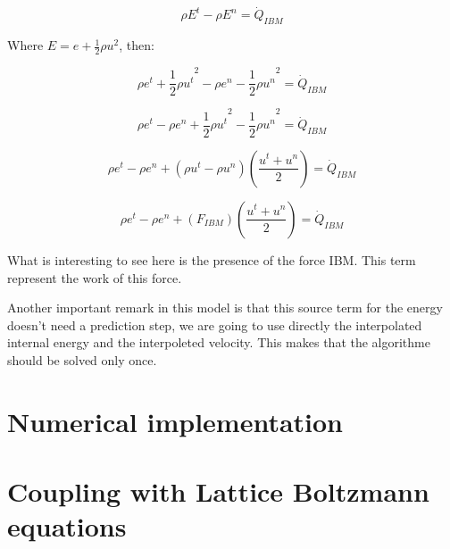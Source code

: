 \begin{equation}
    \rho E^t - \rho E^{n} = \dot{Q}_{IBM}
\end{equation}

Where $E = e + \frac{1}{2}\rho u^2$, then:

\begin{equation}
    \rho {e^t + \frac{1}{2}\rho u^t}^2 - \rho {e^n - \frac{1}{2}\rho u^n}^{2} = \dot{Q}_{IBM}
\end{equation}

\begin{equation}
    \rho {e^t} - \rho {e^n} + {\frac{1}{2}\rho u^t}^2  - {\frac{1}{2}\rho u^n}^{2} = \dot{Q}_{IBM}
\end{equation}

\begin{equation}
    \rho {e^t} - \rho {e^n} + \left({\rho u^t}  - {\rho u^n}\right) \left(\frac{u^t + u^n}{2}\right) = \dot{Q}_{IBM}
\end{equation}

\begin{equation}
    \rho {e^t} - \rho {e^n} + \left(F_{IBM}\right) \left(\frac{u^t + u^n}{2}\right) = \dot{Q}_{IBM}
\end{equation}

What is interesting to see here is the presence of the force IBM. This term
represent the work of this force.

Another important remark in this model is that this source term for the energy
doesn't need a prediction step, we are going to use directly the interpolated
internal energy and the interpoleted velocity. This makes that the algorithme
should be solved only once. 

\section{Numerical implementation}
\section{Coupling with Lattice Boltzmann equations}
